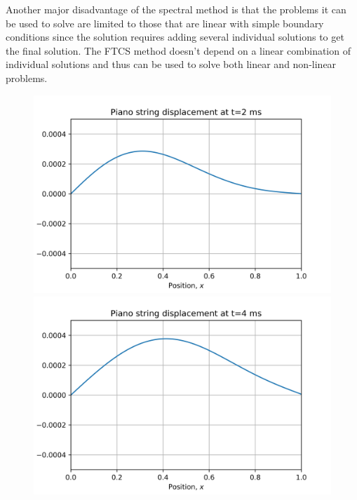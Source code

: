 \documentclass{article}
\begin{document}
Another major disadvantage of the spectral method is that the problems it can be used to solve are limited to those that are linear with simple boundary conditions since the solution requires adding several individual solutions to get the final solution. The FTCS method doesn't depend on a linear combination of individual solutions and thus can be used to solve both linear and non-linear problems.

\begin{figure}[H] 	 
	\begin{minipage}[b]{0.33\linewidth}
  		\includegraphics[width=1.0\linewidth]{../images/wave_eqtn_2ms.png} 
  	\end{minipage} 
  	\begin{minipage}[b]{0.33\linewidth}
    	\includegraphics[width=1.0\linewidth]{../images/wave_eqtn_4ms.png} 
  	\end{minipage} 
  	\begin{minipage}[b]{0.33\linewidth}

\end{minipage}
\end{figure}
\end{document}
